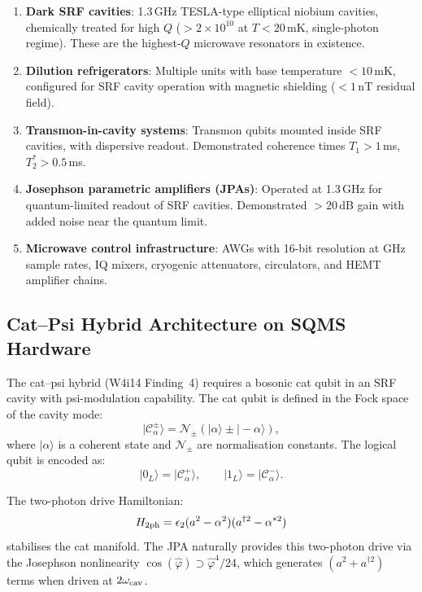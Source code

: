 \documentclass[11pt]{article}
\theoremstyle{definition}
\theoremstyle{remark}
\newcommand{\ee}[1]{\times 10^{#1}}
\begin{document}
\begin{enumerate}
  \item \textbf{Dark SRF cavities}: 1.3\,GHz TESLA-type elliptical
    niobium cavities, chemically treated for high $Q$ ($> 2\ee{10}$
    at $T < 20$\,mK, single-photon regime).  These are the highest-$Q$
    microwave resonators in existence.

  \item \textbf{Dilution refrigerators}: Multiple units with base
    temperature $< 10$\,mK, configured for SRF cavity operation with
    magnetic shielding ($< 1$\,nT residual field).

  \item \textbf{Transmon-in-cavity systems}: Transmon qubits mounted
    inside SRF cavities, with dispersive readout.  Demonstrated
    coherence times $T_1 > 1$\,ms, $T_2^* > 0.5$\,ms.

  \item \textbf{Josephson parametric amplifiers (JPAs)}: Operated at
    1.3\,GHz for quantum-limited readout of SRF cavities.  Demonstrated
    $> 20$\,dB gain with added noise near the quantum limit.

  \item \textbf{Microwave control infrastructure}: AWGs with 16-bit
    resolution at GHz sample rates, IQ mixers, cryogenic attenuators,
    circulators, and HEMT amplifier chains.
\end{enumerate}

\subsection{Cat--Psi Hybrid Architecture on SQMS Hardware}

The cat--psi hybrid (W4i14 Finding~4) requires a bosonic cat qubit in
an SRF cavity with psi-modulation capability.  The cat qubit is defined
in the Fock space of the cavity mode:
\begin{equation}
  |\mathcal{C}_\alpha^\pm\rangle = \mathcal{N}_\pm
  (|\alpha\rangle \pm |-\alpha\rangle),
\end{equation}
where $|\alpha\rangle$ is a coherent state and $\mathcal{N}_\pm$ are
normalisation constants.  The logical qubit is encoded as:
\begin{equation}
  |0_L\rangle = |\mathcal{C}_\alpha^+\rangle, \qquad
  |1_L\rangle = |\mathcal{C}_\alpha^-\rangle.
\end{equation}

The two-photon drive Hamiltonian:
\begin{equation}
  H_{\rm 2ph} = \epsilon_2 (a^2 - \alpha^2)(a^{\dagger 2} - \alpha^{*2})
\end{equation}
stabilises the cat manifold.  The JPA naturally provides this
two-photon drive via the Josephson nonlinearity $\cos(\hat\varphi)
\supset \hat\varphi^4/24$, which generates $(a^2 + a^{\dagger 2})$
terms when driven at $2\omega_{\rm cav}$.
\end{document}

